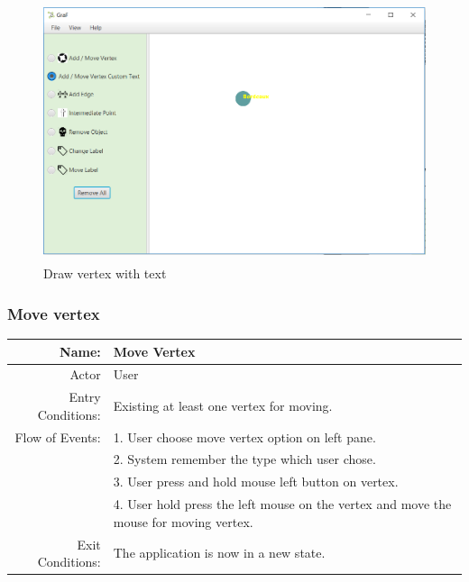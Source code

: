 \documentclass[a4paper,10pt]{article}
\begin{document}
\paragraph{}
\begin{figure}[H]
		\centering
		\includegraphics[height = 3in]{drawVertexWithText2.png}
		\caption[Optional caption]{Draw vertex with text}
		\label{fig:Repository}
	\end{figure}
%

\subsubsection{Move vertex}
	\begin{tabular}{|r|l|}
\hline
Name: & Move Vertex \\
\hline
Actor & User \\
\hline
Entry Conditions: & Existing at least one vertex for moving. \\
\hline
Flow of Events: & 1. User choose move vertex option on left pane. \\
& 2. System remember the type which user chose.  \\
& 3. User press and hold mouse left button on vertex.  \\
& 4. User hold press the left mouse on the vertex and move the mouse for moving vertex.  \\
\hline
Exit Conditions: & The application is now in a new state. \\
\hline

\end{tabular}
	\paragraph{}
	
\end{document}
